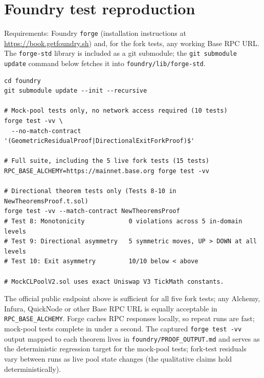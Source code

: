 \documentclass[11pt,a4paper]{article}
\theoremstyle{definition}
\newenvironment{codeblock}{%
  \begin{mdframed}[%
    backgroundcolor=brown!3!white,%
    linewidth=0pt,%
    innertopmargin=6pt,%
    innerbottommargin=6pt,%
    innerleftmargin=12pt,%
    innerrightmargin=12pt,%
    leftmargin=0.075\linewidth,%
    rightmargin=0.075\linewidth,%
    skipabove=6pt,%
    skipbelow=6pt%
  ]\footnotesize%
}{%
  \end{mdframed}%
}
\begin{document}
\appendix
{}
\titlespacing*{\section}{0pt}{18pt}{8pt}

\section{Foundry test reproduction}\label{app:foundry}

Requirements: Foundry \texttt{forge} (installation instructions at \url{https://book.getfoundry.sh}) and, for the fork tests, any working Base RPC URL. The \texttt{forge-std} library is included as a git submodule; the \texttt{git submodule update} command below fetches it into \texttt{foundry/lib/forge-std}.

\begin{codeblock}
\begin{verbatim}
cd foundry
git submodule update --init --recursive

# Mock-pool tests only, no network access required (10 tests)
forge test -vv \
  --no-match-contract '(GeometricResidualProof|DirectionalExitForkProof)$'

# Full suite, including the 5 live fork tests (15 tests)
RPC_BASE_ALCHEMY=https://mainnet.base.org forge test -vv

# Directional theorem tests only (Tests 8-10 in NewTheoremsProof.t.sol)
forge test -vv --match-contract NewTheoremsProof
# Test 8: Monotonicity            0 violations across 5 in-domain levels
# Test 9: Directional asymmetry   5 symmetric moves, UP > DOWN at all levels
# Test 10: Exit asymmetry         10/10 below < above

# MockCLPoolV2.sol uses exact Uniswap V3 TickMath constants.
\end{verbatim}
\end{codeblock}

\noindent The official public endpoint above is sufficient for all five fork tests; any Alchemy, Infura, QuickNode or other Base RPC URL is equally acceptable in \texttt{RPC\_BASE\_ALCHEMY}. Forge caches RPC responses locally, so repeat runs are fast; mock-pool tests complete in under a second. The captured \texttt{forge test -vv} output mapped to each theorem lives in \texttt{foundry/PROOF\_OUTPUT.md} and serves as the deterministic regression target for the mock-pool tests; fork-test residuals vary between runs as live pool state changes (the qualitative claims hold deterministically).
\end{document}
